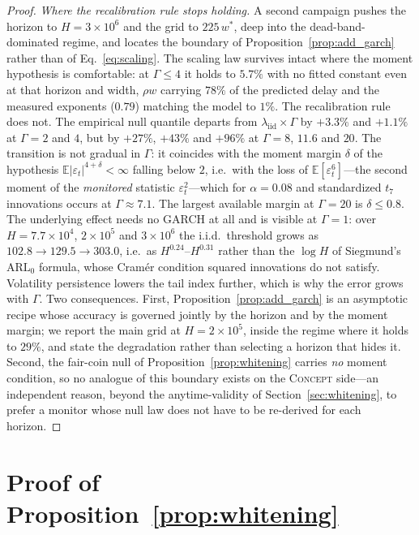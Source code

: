 \documentclass[sigconf,anonymous,review]{acmart}
\theoremstyle{acmdefinition}
\begin{document}
\begin{proof}
    \emph{Where the recalibration rule stops holding.}
    A second campaign pushes the horizon to $H = 3\times10^6$ and the grid to $225\,w^*$, deep into the dead-band-dominated regime, and locates the boundary of Proposition~\ref{prop:add_garch} rather than of Eq.~\eqref{eq:scaling}.
    The scaling law survives intact where the moment hypothesis is comfortable: at $\Gamma \le 4$ it holds to $5.7\%$ with no fitted constant even at that horizon and width, $\rho w$ carrying $78\%$ of the predicted delay and the measured exponents ($0.79$) matching the model to $1\%$.
    The recalibration rule does not. The empirical null quantile departs from $\lambda_{\mathrm{iid}} \times \Gamma$ by $+3.3\%$ and $+1.1\%$ at $\Gamma = 2$ and $4$, but by $+27\%$, $+43\%$ and $+96\%$ at $\Gamma = 8$, $11.6$ and $20$. The transition is not gradual in $\Gamma$: it coincides with the moment margin $\delta$ of the hypothesis $\mathbb{E}|\varepsilon_t|^{4+\delta} < \infty$ falling below $2$, i.e.\ with the loss of $\mathbb{E}[\varepsilon_t^6]$---the second moment of the \emph{monitored} statistic $\varepsilon_t^2$---which for $\alpha = 0.08$ and standardized $t_7$ innovations occurs at $\Gamma \approx 7.1$. The largest available margin at $\Gamma = 20$ is $\delta \le 0.8$.
    The underlying effect needs no GARCH at all and is visible at $\Gamma = 1$: over $H = 7.7\times10^4$, $2\times10^5$ and $3\times10^6$ the i.i.d.\ threshold grows as $102.8 \to 129.5 \to 303.0$, i.e.\ as $H^{0.24}$--$H^{0.31}$ rather than the $\log H$ of Siegmund's $\mathrm{ARL}_0$ formula, whose Cram\'er condition squared innovations do not satisfy. Volatility persistence lowers the tail index further, which is why the error grows with $\Gamma$.
    Two consequences. First, Proposition~\ref{prop:add_garch} is an asymptotic recipe whose accuracy is governed jointly by the horizon and by the moment margin; we report the main grid at $H = 2\times10^5$, inside the regime where it holds to $29\%$, and state the degradation rather than selecting a horizon that hides it. Second, the fair-coin null of Proposition~\ref{prop:whitening} carries \emph{no} moment condition, so no analogue of this boundary exists on the \textsc{Concept} side---an independent reason, beyond the anytime-validity of Section~\ref{sec:whitening}, to prefer a monitor whose null law does not have to be re-derived for each horizon.
\end{proof}

\section{Proof of Proposition~\ref{prop:whitening}}\label{app:whitening}
\end{document}
